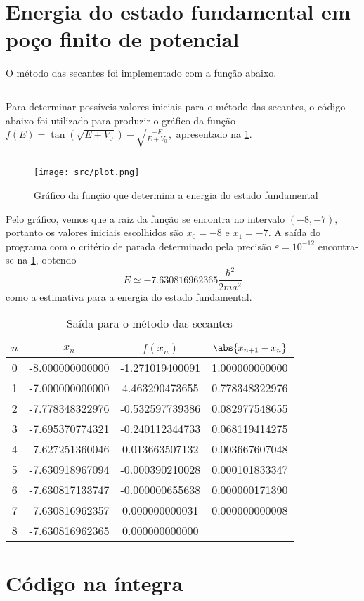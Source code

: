 \documentclass[portuguese,minted]{artigo}
\begin{document}
    \section{Energia do estado fundamental em poço finito de potencial}
    O método das secantes foi implementado com a função abaixo.
    \inputminted[firstline=59,lastline=83]{c}{src/main.c}

    Para determinar possíveis valores iniciais para o método das secantes, o código abaixo foi utilizado para produzir o gráfico da função \(f(E) = \tan(\sqrt{E + V_0}) - \sqrt{\frac{-E}{E + V_0}},\) apresentado na \cref{fig:plot}.
    \inputminted{python}{src/plot.py}
    \begin{figure}[!ht]
        \centering
        \texttt{[image: src/plot.png]}
        \caption{Gráfico da função que determina a energia do estado fundamental}
        \label{fig:plot}
    \end{figure}

    Pelo gráfico, vemos que a raiz da função se encontra no intervalo \((-8, -7),\) portanto os valores iniciais escolhidos são \(x_0 = -8\) e \(x_1 = -7.\) A saída do programa com o critério de parada determinado pela precisão \(\varepsilon = 10^{-12}\) encontra-se na \cref{tab:c}, obtendo 
    \begin{equation*}
        E \simeq -7.630816962365 \frac{\hbar^2}{2ma^2}
    \end{equation*}
    como a estimativa para a energia do estado fundamental.

    \begin{table}[H]
        \centering
        \caption{Saída para o método das secantes}
        \begin{tabular}{c c c c}
            \toprule
            \(n\) & \(x_{n}\) & \(f(x_{n})\) & \(\abs{x_{n+1} - x_n}\)\\
            \midrule
            0 & -8.000000000000 &-1.271019400091 &1.000000000000\\
            1 & -7.000000000000 & 4.463290473655 &0.778348322976\\
            2 & -7.778348322976 &-0.532597739386 &0.082977548655\\
            3 & -7.695370774321 &-0.240112344733 &0.068119414275\\
            4 & -7.627251360046 & 0.013663507132 &0.003667607048\\
            5 & -7.630918967094 &-0.000390210028 &0.000101833347\\
            6 & -7.630817133747 &-0.000000655638 &0.000000171390\\
            7 & -7.630816962357 & 0.000000000031 &0.000000000008\\
            8 & -7.630816962365 & 0.000000000000 &\\
            \bottomrule
        \end{tabular}
        \label{tab:c}
    \end{table}

    \section{Código na íntegra}
    \inputminted[fontsize=\small]{c}{src/main.c}
\end{document}
